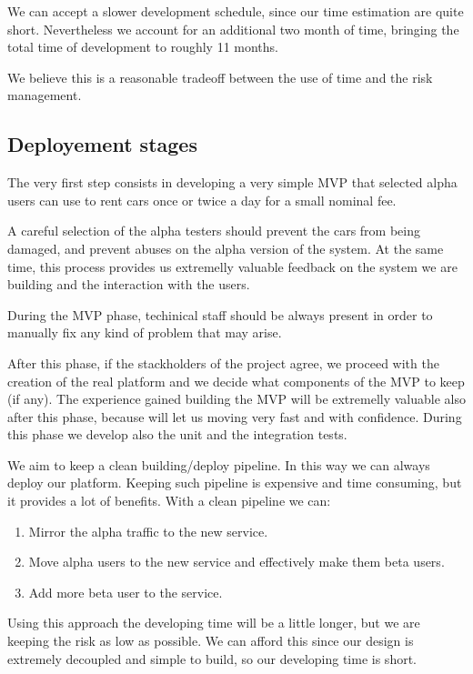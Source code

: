 \documentclass[11pt]{article} %
\begin{document}
We can accept a slower development schedule, since our time estimation are quite short. Nevertheless we account for an additional two month of time, bringing the total time of development to roughly 11 months.

We believe this is a reasonable tradeoff between the use of time and the risk management.

\subsection{Deployement stages}
The very first step consists in developing a very simple MVP that selected alpha users can use to rent cars once or twice a day for a small nominal fee. 

A careful selection of the alpha testers should prevent the cars from being damaged, and prevent abuses on the alpha version of the system. At the same time, this process provides us extremelly valuable feedback on the system we are building and the interaction with the users.

During the MVP phase, techinical staff should be always present in order to manually fix any kind of problem that may arise.

After this phase, if the stackholders of the project agree, we proceed with the creation of the real platform and we decide what components of the MVP to keep (if any). The experience gained building the MVP will be extremelly valuable also after this phase, because will let us moving very fast and with confidence. During this phase we develop also the unit and the integration tests.

We aim to keep a clean building/deploy pipeline. In this way we can always deploy our platform. Keeping such pipeline is expensive and time consuming, but it provides a lot of benefits. With a clean pipeline we can:

\begin{enumerate}[noitemsep]
	\item Mirror the alpha traffic to the new service.
	\item Move alpha users to the new service and effectively make them beta users.
	\item Add more beta user to the service.
\end{enumerate}

Using this approach the developing time will be a little longer, but we are keeping the risk as low as possible. We can afford this since our design is extremely decoupled and simple to build, so our developing time is short.
\end{document}
